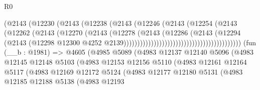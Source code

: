 \begin{lexlean}{R0}
\begin{coremodule}
                                                  (@2143
                                                    (@12230
                                                      (@2143
                                                        (@12238
                                                          (@2143
                                                            (@12246
                                                              (@2143
                                                                (@12254
                                                                  (@2143
                                                                    (@12262
                                                                      (@2143
                                                                        (@12270
                                                                          (@2143
                                                                            (@12278
                                                                              (@2143
                                                                                (@12286
                                                                                  (@2143
                                                                                    (@12294
                                                                                      (@2143
                                                                                        (@12298
                                                                                          @12300
                                                                                          @4252
                                                                                          @2139)))))))))))))))))))))))))))))))))))))))))))
    (fun (__b : @1981) =>
    @4605
      (@4985
        @5089
        (@4983
          @12137
          @12140
          @5096
          (@4983
            @12145
            @12148
            @5103
            (@4983
              @12153
              @12156
              @5110
              (@4983
                @12161
                @12164
                @5117
                (@4983
                  @12169
                  @12172
                  @5124
                  (@4983
                    @12177
                    @12180
                    @5131
                    (@4983
                      @12185
                      @12188
                      @5138
                      (@4983
                        @12193

\end{coremodule}
\end{lexlean}
